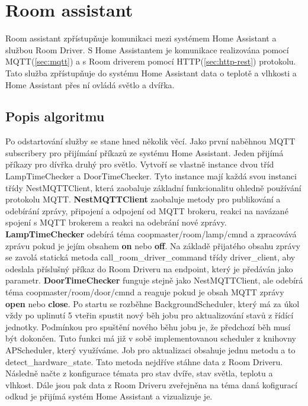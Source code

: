 \section{Room assistant}\label{sec:room-assistant}

Room assistant zpřístupňuje komunikaci mezi systémem Home Assistant a službou Room Driver.\newline
S Home Assistantem je komunikace realizována pomocí MQTT(\ref{sec:mqtt}) a s Room driverem pomocí HTTP(\ref{sec:http-rest}) protokolu.
Tato služba zpřístupňuje do systému Home Assistant data o teplotě a vlhkosti a Home Assistant přes ní ovládá světlo a dvířka.

\subsection*{Popis algoritmu}
Po odstartování služby se stane hned několik věcí.
Jako první naběhnou MQTT subscribery pro přijímání příkazů ze systému Home Assistant.
Jeden přijímá příkazy pro dívřka druhý pro světlo.
Vytvoří se vlastně instance dvou tříd LampTimeChecker a DoorTimeChecker.
Tyto instance mají každá svou instanci třídy NestMQTTClient, která zaobaluje základní funkcionalitu ohledně používání protokolu MQTT.\newline
\textbf{NestMQTTClient} zaobaluje metody pro publikování a odebírání zprávy, připojení a odpojení od MQTT brokeru, reakci na navázané spojení s MQTT brokerem a reakci na odebrání nové zprávy.\newline
\textbf{LampTimeChecker} odebírá téma coopmaster/room/lamp/cmnd a zpracovává zprávu pokud je jejím obsahem \textbf{on} nebo \textbf{off}.
Na základě přijatého obsahu zprávy se zavolá statická metoda call\_room\_driver\_command třídy driver\_client, aby odeslala příslušný příkaz do Room Driveru na endpoint, který je předáván jako parametr.\newline
\textbf{DoorTimeChecker} funguje stejně jako NestMQTTClient, ale odebírá téma coopmaster/room/door/cmnd a reaguje pokud je obsah MQTT zprávy \textbf{open} nebo \textbf{close}.\newline
Po startu se rozběhne BackgroundScheduler, který má za úkol vždy po uplinutí 5 vteřin spustit nový běh jobu pro aktualizování stavů z řídící jednotky.
Podmínkou pro spuštění nového běhu jobu je, že předchozí běh musí být dokončen.
Tuto funkci má již v sobě implementovanou scheduler z knihovny APScheduler, který využíváme.
Job pro aktualizaci obsahuje jednu metodu a to detect\_hardware\_state.
Tato metoda nejdříve stáhne data z Room Driveru.
Následně načte z konfigurace témata pro stav dvíře, stav světla, teplotu a vlhkost.
Dále jsou pak data z Room Driveru zveřejněna na téma daná kofigurací odkud je přijímá systém Home Assistant a vizualizuje je.

